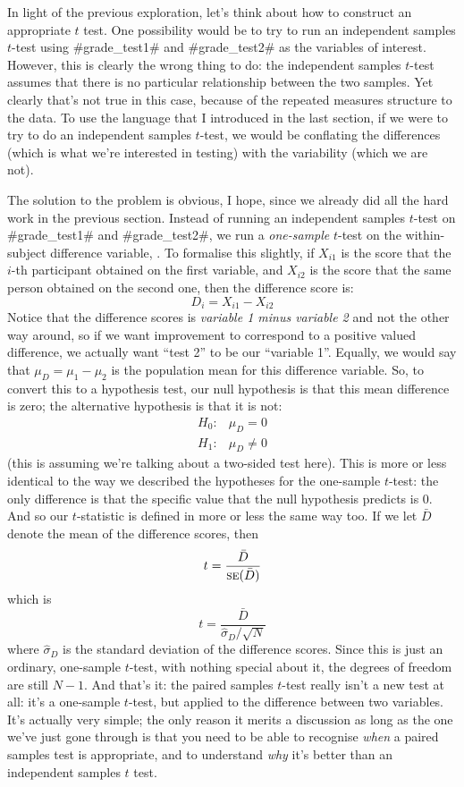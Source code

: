 
In light of the previous exploration, let's think about how to construct an appropriate $t$ test. One possibility would be to try to run an independent samples $t$-test using \rtextverb#grade_test1# and \rtextverb#grade_test2# as the variables of interest. However, this is clearly the wrong thing to do: the independent samples $t$-test assumes that there is no particular relationship between the two samples. Yet clearly that's not true in this case, because of the repeated measures structure to the data. To use the language that I introduced in the last section, if we were to try to do an independent samples $t$-test, we would be conflating the  differences (which is what we're interested in testing) with the  variability (which we are not). 

The solution to the problem is obvious, I hope, since we already did all the hard work in the previous section. Instead of running an independent samples $t$-test on \rtextverb#grade_test1# and \rtextverb#grade_test2#, we run a {\it one-sample} $t$-test on the within-subject difference variable, . To formalise this slightly, if $X_{i1}$ is the score that the $i$-th participant obtained on the first variable, and $X_{i2}$ is the score that the same person obtained on the second one, then the difference score is:
$$
D_{i} = X_{i1} - X_{i2} 
$$
Notice that the difference scores is {\it variable 1 minus variable 2} and not the other way around, so if we want improvement to correspond to a positive valued difference, we actually want ``test 2'' to be our ``variable 1''. Equally, we would say that $\mu_D = \mu_1 - \mu_2$ is the population mean for this difference variable. So, to convert this to a hypothesis test, our null hypothesis is that this mean difference is zero; the alternative hypothesis is that it is not:
$$
\begin{array}{ll}
H_0: & \mu_D = 0  \\
H_1: & \mu_D \neq 0
\end{array}
$$
(this is assuming we're talking about a two-sided test here). This is more or less identical to the way we described the hypotheses for the one-sample $t$-test: the only difference is that the specific value that the null hypothesis predicts is 0. And so our $t$-statistic is defined in more or less the same way too. If we let $\bar{D}$ denote the mean of the difference scores, then 
$$
t = \frac{\bar{D}}{\mbox{\textsc{se}}(\bar{D})}
$$
which is 
$$
t = \frac{\bar{D}}{\hat\sigma_D / \sqrt{N}}
$$
where $\hat\sigma_D$ is the standard deviation of the difference scores. Since this is just an ordinary, one-sample $t$-test, with nothing special about it, the degrees of freedom are still $N-1$. And that's it: the paired samples $t$-test really isn't a new test at all: it's a one-sample $t$-test, but applied to the difference between two variables. It's actually very simple; the only reason it merits a discussion as long as the one we've just gone through is that you need to be able to recognise {\it when} a paired samples test is appropriate, and to understand {\it why} it's better than an independent samples $t$ test. 


